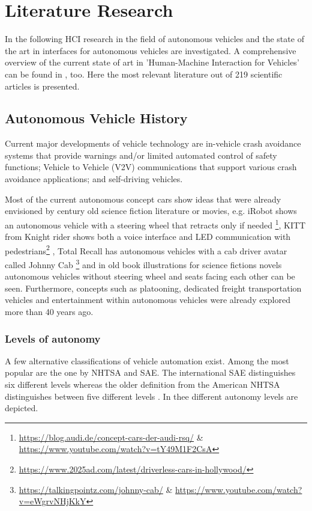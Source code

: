 \chapter{Literature Research}
\label{ch:literature}

In the following HCI research in the field of autonomous vehicles and the state of the art in interfaces for autonomous vehicles are investigated. A comprehensive overview of the current state of art in 'Human-Machine Interaction for Vehicles' can be found in \cite{Kun2018}, too. Here the most relevant literature out of 219 scientific articles is presented. 

\section{Autonomous Vehicle History}\label{sec:history}
Current major developments of vehicle technology are in-vehicle crash avoidance systems that provide warnings and/or limited automated control of safety functions; Vehicle to Vehicle (V2V) communications that support various crash avoidance applications; and self-driving vehicles. 

Most of the current autonomous concept cars show ideas that were already envisioned by century old science fiction literature or movies, e.g. iRobot shows an autonomous vehicle with a steering wheel that retracts only if needed \footnote{\url{https://blog.audi.de/concept-cars-der-audi-rsq/} \& \url{https://www.youtube.com/watch?v=tY49M1F2CsA}}, KITT from Knight rider shows both a voice interface and LED communication with pedestrians\footnote{\url{https://www.2025ad.com/latest/driverless-cars-in-hollywood/}} , Total Recall has autonomous vehicles with a cab driver avatar called Johnny Cab \footnote{\url{https://talkingpointz.com/johnny-cab/} \& \url{https://www.youtube.com/watch?v=eWgrvNHjKkY}} and in old book illustrations for science fictions novels autonomous vehicles without steering wheel and seats facing each other can be seen\cite{Radtke1974DieMorgen}. Furthermore, concepts such as platooning, dedicated freight transportation vehicles and entertainment within autonomous vehicles were already explored more than 40 years ago. 

\subsection{Levels of autonomy}\label{ssec:levels}
A few alternative classifications of vehicle automation exist. Among the most popular are the one by NHTSA and SAE. The international SAE  distinguishes six different levels  \cite{SAEinternational2016} whereas the older definition from the American NHTSA  distinguishes between five different levels \cite{NHTSA2013}. In  thee different autonomy levels are depicted. 

